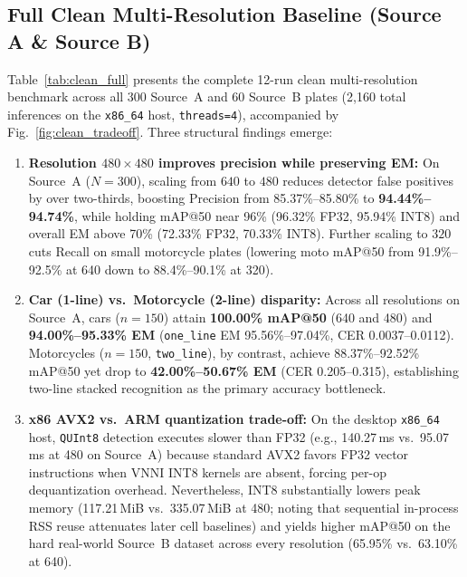 \documentclass[pdflatex,sn-mathphys-num]{sn-jnl}
\begin{document}
\subsection{Full Clean Multi-Resolution Baseline (Source A \& Source B)}\label{subsec:exp_clean}
Table~\ref{tab:clean_full} presents the complete 12-run clean multi-resolution benchmark across all 300 Source~A and 60 Source~B plates (2,160 total inferences on the \texttt{x86\_64} host, \texttt{threads=4}), accompanied by Fig.~\ref{fig:clean_tradeoff}. Three structural findings emerge:
\begin{enumerate}
    \item \textbf{Resolution $480\times 480$ improves precision while preserving EM:} On Source~A ($N=300$), scaling from $640$ to $480$ reduces detector false positives by over two-thirds, boosting Precision from 85.37\%--85.80\% to \textbf{94.44\%--94.74\%}, while holding mAP@50 near 96\% (96.32\% FP32, 95.94\% INT8) and overall EM above 70\% (72.33\% FP32, 70.33\% INT8). Further scaling to $320$ cuts Recall on small motorcycle plates (lowering moto mAP@50 from 91.9\%--92.5\% at 640 down to 88.4\%--90.1\% at 320).
    \item \textbf{Car (1-line) vs.\ Motorcycle (2-line) disparity:} Across all resolutions on Source~A, cars ($n=150$) attain \textbf{100.00\% mAP@50} (640 and 480) and \textbf{94.00\%--95.33\% EM} (\texttt{one\_line} EM 95.56\%--97.04\%, CER 0.0037--0.0112). Motorcycles ($n=150$, \texttt{two\_line}), by contrast, achieve 88.37\%--92.52\% mAP@50 yet drop to \textbf{42.00\%--50.67\% EM} (CER 0.205--0.315), establishing two-line stacked recognition as the primary accuracy bottleneck.
    \item \textbf{x86 AVX2 vs.\ ARM quantization trade-off:} On the desktop \texttt{x86\_64} host, \texttt{QUInt8} detection executes slower than FP32 (e.g., 140.27\,ms vs.\ 95.07\,ms at 480 on Source~A) because standard AVX2 favors FP32 vector instructions when VNNI INT8 kernels are absent, forcing per-op dequantization overhead. Nevertheless, INT8 substantially lowers peak memory (117.21\,MiB vs.\ 335.07\,MiB at 480; noting that sequential in-process RSS reuse attenuates later cell baselines) and yields higher mAP@50 on the hard real-world Source~B dataset across every resolution (65.95\% vs.\ 63.10\% at 640).
\end{enumerate}
\end{document}
